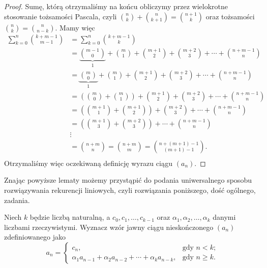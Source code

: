 \documentclass[shortabstract]{imthesis}
\begin{document}
\begin{proof}
    Sumę, którą otrzymaliśmy na końcu obliczymy przez wielokrotne stosowanie tożsamości Pascala, czyli ${n \choose k} + {n \choose k+1} = {n+1 \choose k}$ oraz tożsamości ${n \choose k} = {n \choose n-k}$. Mamy więc
    \begin{align*}
        \sum_{k=0}^n {k+m-1 \choose m-1} &= \sum_{k=0}^n {k+m-1 \choose k} \\
        &= \underbrace{{m-1 \choose 0}}_1 + {m \choose 1} + {m+1 \choose 2} + {m+2 \choose 3} + \cdots + {n+m-1 \choose n} \\
        &= \underbrace{{m \choose 0}}_1 + {m \choose 1} + {m+1 \choose 2} + {m+2 \choose 3} + \cdots + {n+m-1 \choose n} \\
        &= \left({m \choose 0} + {m \choose 1}\right) + {m+1 \choose 2} + {m+2 \choose 3} + \cdots + {n+m-1 \choose n} \\
        &= \left({m+1 \choose 1} + {m+1 \choose 2}\right) + {m+2 \choose 3} + \cdots + {n+m-1 \choose n} \\
        &= \left({m+1 \choose 3} + {m+2 \choose 3}\right) + \cdots + {n+m-1 \choose n} \\
        &\vdots \\
        &= {n+m \choose n} = {n+m \choose m} = {n+(m+1)-1 \choose (m+1)-1}. \\
    \end{align*}
    Otrzymaliśmy więc oczekiwaną definicję wyrazu ciągu $(a_n)$.
    \end{proof}

    Znając powyższe lematy możemy przystąpić do podania uniwersalnego sposobu rozwiązywania rekurencji liniowych, czyli rozwiązania poniższego, dość ogólnego, zadania.
    \begin{problem}
    Niech $k$ będzie liczbą naturalną, a $c_0, c_1, \ldots, c_{k-1}$ oraz $\alpha_1, \alpha_2, \ldots, \alpha_k$ danymi liczbami rzeczywistymi. Wyznacz wzór jawny ciągu nieskończonego $(a_n)$ zdefiniowanego jako
    $$
    a_n = \begin{cases} c_n, &\text{gdy $n < k$;} \\ \alpha_1 a_{n-1} + \alpha_2 a_{n-2} + \cdots + \alpha_k a_{n-k}, &\text{gdy $n \geq k$.} \end{cases}
    $$
    \end{problem}
    
\end{document}
